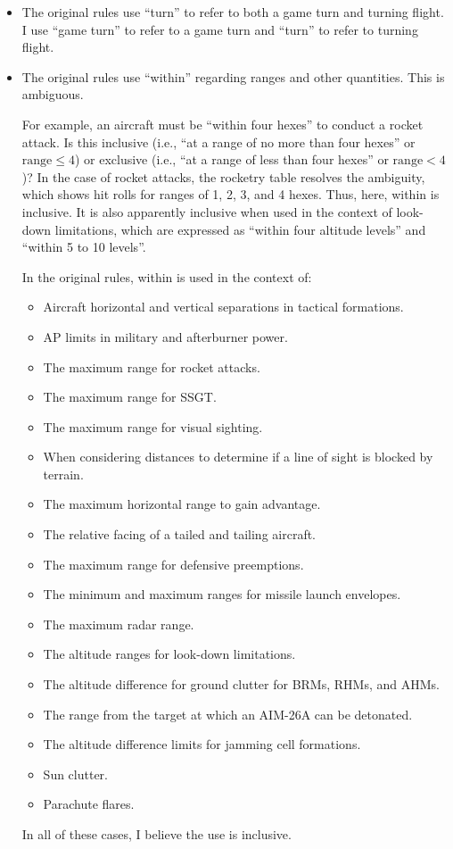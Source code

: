 \documentclass[10pt]{report}
\begin{document}
\begin{itemize}
    \item {} The original rules use “turn” to refer to both a game turn and turning flight. I use “game turn” to refer to a game turn and “turn” to refer to turning flight.

    \item {} The original rules use “within” regarding ranges and other quantities. This is ambiguous. 
    
    For example, an aircraft must be “within four hexes” to conduct a rocket attack. Is this inclusive (i.e., “at a range of no more than four hexes” or $\textrm{range}\le4$) or exclusive (i.e., “at a range of less than four hexes” or $\textrm{range}<4$)? In the case of rocket attacks, the rocketry table resolves the ambiguity, which shows hit rolls for ranges of 1, 2, 3, and 4 hexes. Thus, here, within is inclusive. It is also apparently inclusive when used in the context of look-down limitations, which are expressed as “within four altitude levels” and “within 5 to 10 levels”.

    In the original rules, within is used in the context of:
    \begin{itemize}
    \item Aircraft horizontal and vertical separations in tactical formations.
    \item AP limits in military and afterburner power.
    \item The maximum range for rocket attacks.
    \item The maximum range for SSGT.
    \item The maximum range for visual sighting.
    \item When considering distances to determine if a line of sight is blocked by terrain.
    \item The maximum horizontal range to gain advantage.
    \item The relative facing of a tailed and tailing aircraft.
    \item The maximum range for defensive preemptions.
    \item The minimum and maximum ranges for missile launch envelopes.
    \item The maximum radar range.
    \item The altitude ranges for look-down limitations.
    \item The altitude difference for ground clutter for BRMs, RHMs, and AHMs.
    \item The range from the target at which an AIM-26A can be detonated.
    \item The altitude difference limits for jamming cell formations.
    \item Sun clutter.
    \item Parachute flares.
    \end{itemize}
    In all of these cases, I believe the use is inclusive.

\end{itemize}
\end{document}
